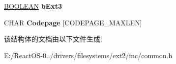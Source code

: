 \begin{DoxyCompactItemize}
\item 
\mbox{\label{struct___e_x_t2___v_o_l_u_m_e___p_r_o_p_e_r_t_y_ac7f46e389c10728c04bd87c9b3b62a0f}} 
\hyperlink{_processor_bind_8h_a112e3146cb38b6ee95e64d85842e380a}{B\+O\+O\+L\+E\+AN} {\bfseries b\+Ext3}
\item 
\mbox{\label{struct___e_x_t2___v_o_l_u_m_e___p_r_o_p_e_r_t_y_ab5f58d409c2853625a8272a580b509c0}} 
C\+H\+AR {\bfseries Codepage} \mbox{[}C\+O\+D\+E\+P\+A\+G\+E\+\_\+\+M\+A\+X\+L\+EN\mbox{]}
\end{DoxyCompactItemize}


该结构体的文档由以下文件生成\+:\begin{DoxyCompactItemize}
\item 
E\+:/\+React\+O\+S-\/0../drivers/filesystems/ext2/inc/common.\+h\end{DoxyCompactItemize}
